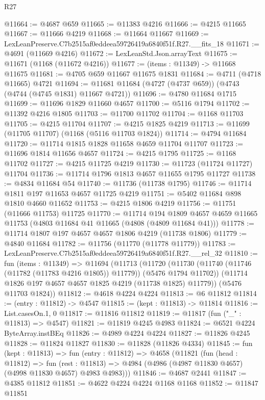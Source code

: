 \begin{lexlean}{R27}
\begin{coremodule}
@11664 := @4687 @659
@11665 := @11383 @4216
@11666 := @4215 @11665
@11667 := @11666 @4219
@11668 := @11664 @11667
@11669 := LexLeanPreserve.C7b2515af0eddeea59726419a6840f51f.R27.__fits_18
@11671 := @4691 (@11669 @4216)
@11672 := LexLeanStd.Json.arrayText
@11675 := @11671 (@1168 (@11672 @4216))
@11677 := (items : @11349) -> @11668 @11675
@11681 := @4705 @659 @11667 @11675 @1831
@11684 := @4711 (@4718 @11665) @4721
@11694 := @11681 @11684 (@4727 (@4737 @659)) (@4743 (@4744 (@4745 @1831) @11667 @4721))
@11696 := @4780 @11684 @1715
@11699 := @11696 @1829 @11660 @4657
@11700 := @5116 @1794
@11702 := @11392 @4216 @1805
@11703 := @11700 @11702
@11704 := @1168 @11703
@11705 := @4215 @11704
@11707 := @4215 @1825 @4219
@11713 := @11699 (@11705 @11707) (@1168 (@5116 @11703 @1824))
@11714 := @4794 @11684
@11720 := @11714 @1815 @1828 @11658 @4659 @11704 @11707
@11723 := @11696 @1814 @11656 @4657
@11724 := @4215 @1795
@11725 := @1168 @11702
@11727 := @4215 @11725 @4219
@11730 := @11723 (@11724 @11727) @11704
@11736 := @11714 @1796 @1813 @4657 @11655 @1795 @11727
@11738 := @4834 @11684 @54
@11740 := @11736 (@11738 @1795)
@11746 := @11714 @1811 @197 @11653 @4657 @11725 @4219
@11751 := @5402 @11684 @898 @1810 @4660 @11652
@11753 := @4215 @1806 @4219
@11756 := @11751 (@11666 @11753) @11725
@11770 := @11714
    @194
    @1809
    @4657
    @4659
    @11665
    @11753
    (@4803 @11684 @41 @11665 (@4808 (@4809 @11684 @41)))
@11778 := @11714 @1807 @197 @4657 @4657 @1806 @4219 (@11738 @1806)
@11779 := @4840 @11684
@11782 := @11756 (@11770 (@11778 @11779))
@11783 := LexLeanPreserve.C7b2515af0eddeea59726419a6840f51f.R27.__rel_32
@11810 := fun (items : @11349) =>
  @11694
    (@11713
      (@11720
        (@11730 (@11740 (@11746 (@11782 (@11783 @4216 @1805)) @11779)) (@5476 @1794 @11702))
        (@11714 @1826 @197 @4657 @4657 @1825 @4219 (@11738 @1825) @11779))
      (@5476 @11703 @1824))
@11812 := @4618 @4224 @4224
@11813 := @6 @11812
@11814 := (entry : @11812) -> @4547
@11815 := (kept : @11813) -> @11814
@11816 := List.casesOn.{1, 0}
@11817 := @11816 @11812
@11819 := @11817 (fun ("_" : @11813) => @4547)
@11821 := @11819 @4245 @4983
@11824 := @6521 @4224 ByteArray.instBEq
@11826 := @4989 @4224 @4224
@11827 := @11826 @4245
@11828 := @11824 @11827
@11830 := @11828 (@11826 @4334)
@11845 := fun (kept : @11813) =>
  fun (entry : @11812) =>
  @4658
    (@11821
      (fun (head : @11812) =>
      fun (rest : @11813) => @4984 (@4986 (@4987 @11830 @4657) (@4998 @11830 @4657) @4983 @4983)))
@11846 := @4687 @2441
@11847 := @4385 @11812
@11851 := @4622 @4224 @4224 @1168 @1168
@11852 := @11847 @11851

\end{coremodule}
\end{lexlean}
